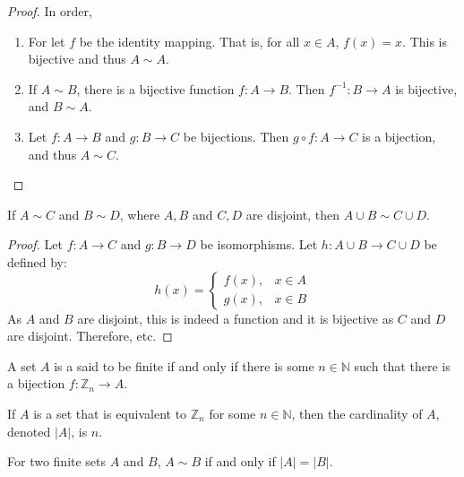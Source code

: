         \begin{proof}
        In order,
        \begin{enumerate}
        \item   For let $f$ be the identity mapping. That is, for all
                $x\in A$, $f(x)=x$. This is bijective and thus $A\sim A$.
        \item   If $A\sim B$, there is a bijective function $f:A\rightarrow B$.
                Then $f^{-1}:B\rightarrow A$ is bijective, and $B\sim A$.
        \item   Let $f:A\rightarrow B$ and $g:B\rightarrow C$ be bijections.
                Then $g\circ f:A\rightarrow C$ is a bijection,
                and thus $A\sim C$.
        \end{enumerate}
        \end{proof}
        \begin{theorem}
            If $A\sim{C}$ and $B\sim{D}$, where $A,B$ and $C,D$ are disjoint,
            then $A\cup{B}\sim{C}\cup{D}$.
        \end{theorem}
        \begin{proof}
            Let $f:A\rightarrow C$ and $g:B\rightarrow D$ be isomorphisms.
            Let $h:A\cup{B}\rightarrow{C}\cup{D}$ be defined by:
            \begin{equation}
                h(x)=
                \begin{cases}
                    f(x),&x\in{A}\\
                    g(x),&x\in{B}
                \end{cases}
            \end{equation}
            As $A$ and $B$ are disjoint, this is indeed a function and it is
            bijective as $C$ and $D$ are disjoint. Therefore, etc.
        \end{proof}
        \begin{definition}
        A set $A$ is a said to be finite if and only if there is some $n\in \mathbb{N}$ such
        that there is a bijection $f:\mathbb{Z}_n \rightarrow A$.
        \end{definition}
        \begin{definition}
        If $A$ is a set that is equivalent to $\mathbb{Z}_n$ for some $n\in \mathbb{N}$,
        then the cardinality of $A$, denoted $|A|$, is $n$.
        \end{definition}
        \begin{theorem}
        For two finite sets $A$ and $B$, $A\sim B$ if and only if $|A|=|B|$.
        \end{theorem}
